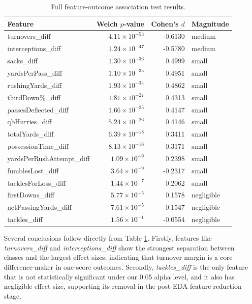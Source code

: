 \documentclass[11pt]{amsart}
\theoremstyle{definition}                  %
\theoremstyle{remark}                       %
\numberwithin{equation}{section}
\begin{document}
\begin{table}[h!]
\centering
\small
\begin{tabular}{lrrl}
\toprule
\textbf{Feature} & \textbf{Welch $p$-value} & \textbf{Cohen's $d$} & \textbf{Magnitude} \\
\midrule
turnovers\_diff           & $4.11\times 10^{-53}$ & -0.6130 & medium \\
interceptions\_diff       & $1.24\times 10^{-47}$ & -0.5780 & medium \\
sacks\_diff               & $1.30\times 10^{-36}$ &  0.4999 & small \\
yardsPerPass\_diff        & $1.10\times 10^{-35}$ &  0.4951 & small \\
rushingYards\_diff        & $1.93\times 10^{-34}$ &  0.4862 & small \\
thirdDown\%\_diff         & $1.81\times 10^{-27}$ &  0.4313 & small \\
passesDeflected\_diff     & $1.66\times 10^{-25}$ &  0.4147 & small \\
qbHurries\_diff           & $5.24\times 10^{-26}$ &  0.4146 & small \\
totalYards\_diff          & $6.39\times 10^{-18}$ &  0.3411 & small \\
possessionTime\_diff      & $8.13\times 10^{-16}$ &  0.3171 & small \\
yardsPerRushAttempt\_diff & $1.09\times 10^{-9}$  &  0.2398 & small \\
fumblesLost\_diff         & $3.64\times 10^{-9}$  & -0.2317 & small \\
tacklesForLoss\_diff      & $1.44\times 10^{-7}$  &  0.2062 & small \\
firstDowns\_diff          & $5.77\times 10^{-5}$  &  0.1578 & negligible \\
netPassingYards\_diff     & $7.61\times 10^{-5}$  & -0.1547 & negligible \\
tackles\_diff             & $1.56\times 10^{-1}$  & -0.0554 & negligible \\
\bottomrule
\end{tabular}
\caption{Full feature-outcome association test results.}
\label{tab:feature_tests_full}
\end{table}
\FloatBarrier

Several conclusions follow directly from Table \ref{tab:feature_tests_full}. Firstly, features like \textit{turnovers\_diff} and \textit{interceptions\_diff} show the strongest separation between classes and the largest effect sizes, indicating that turnover margin is a core difference-maker in one-score outcomes. Secondly, \textit{tackles\_diff} is the only feature that is not statistically significant under our 0.05 alpha level, and it also has negligible effect size, supporting its removal in the post-EDA feature reduction stage.
\end{document}
